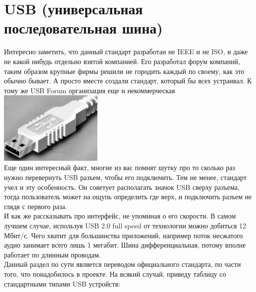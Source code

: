 \documentclass[12pt,a4paper]{article}
\begin{document}
\section{USB (универсальная последовательная шина)}
    Интересно заметить, что данный стандарт разработан не IEEE и не ISO, и
    даже не какой нибудь отдельно взятой компанией. Его разработал форум
    компаний, таким образом крупные фирмы решили не городить каждый по своему,
    как это обычно бывает. А просто вместе создали стандарт, который
    бы всех устраивал. К тому же USB Forum организация еще и некоммерческая\\
\includegraphics[width=5cm]{plug.png}\\
    Еще один интересный факт, многие из вас помнят шутку про то сколько раз нужно
    перевернуть USB разъем, чтобы его подключить. Тем не менее, стандарт
    учел и эту особенность. Он советует располагать значок USB сверху разъема,
    тогда пользователь может на ощупь определить где верх, и подключить разъем
    не глядя с первого раза.\\
    И как же рассказывать про интерфейс, не упоминая о его скорости.
    В самом лучшем случае, используя USB 2.0 full speed от технологии можно
    добиться 12 Мбит/с. Чего хватит для большинства приложений, например поток
    несжатого аудио занимает всего лишь 1 мегабит. Шина дифференциальная,
    потому вполне работает по длинным проводам.\\
    Данный раздел по сути является переводом официального стандарта, по части
    того, что понадобилось в проекте.
    На всякий случай, приведу таблицу со стандартными типами USB устройств:
\end{document}
